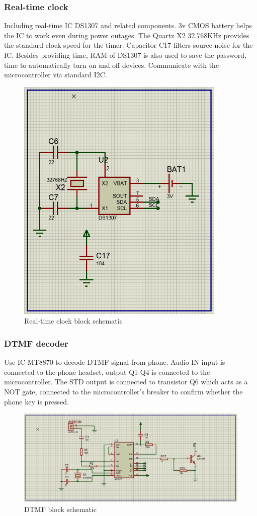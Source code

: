 \documentclass[a4paper]{article}
\begin{document}
\subsubsection{Real-time clock}
Including real-time IC DS1307 and related components. 3v CMOS battery helps the IC to work even during power outages. The Quartz X2 32.768KHz provides the standard clock speed for the timer. Capacitor C17 filters source noise for the IC. Besides providing time, RAM of DS1307 is also used to save the password, time to automatically turn on and off devices. Communicate with the microcontroller via standard I2C.
\begin{figure}[h!]
\centering
\includegraphics[width=10cm]{images/RTC.PNG}
\caption*{Real-time clock block schematic}
\end{figure}
\subsubsection{DTMF decoder}
Use IC MT8870 to decode DTMF signal from phone. Audio IN input is connected to the phone headset, output Q1-Q4 is connected to the microcontroller. The STD output is connected to transistor Q6 which acts as a NOT gate, connected to the microcontroller's breaker to confirm whether the phone key is pressed.
\begin{figure}[h!]
\centering
\includegraphics[width=17cm]{images/DTMF.PNG}
\caption*{DTMF block schematic}
\end{figure}
\end{document}
